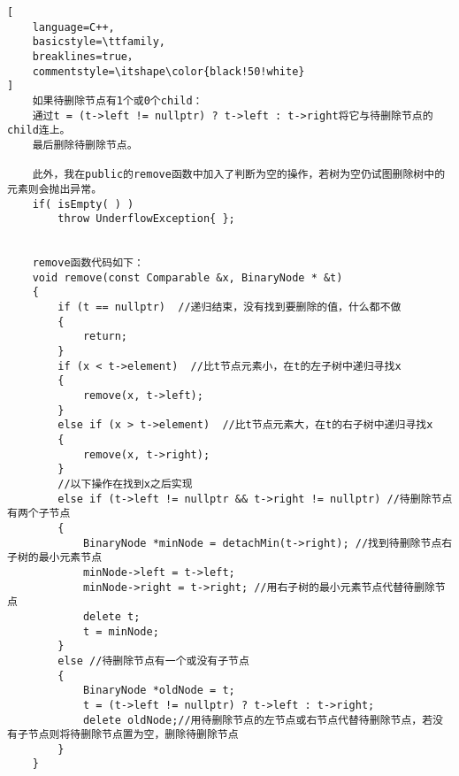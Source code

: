 \documentclass[UTF8]{ctexart}
\begin{document}
\begin{lstlisting}[
    language=C++,
    basicstyle=\ttfamily,
    breaklines=true，
    commentstyle=\itshape\color{black!50!white}
]
    如果待删除节点有1个或0个child：
    通过t = (t->left != nullptr) ? t->left : t->right将它与待删除节点的child连上。
    最后删除待删除节点。

    此外，我在public的remove函数中加入了判断为空的操作，若树为空仍试图删除树中的元素则会抛出异常。
    if( isEmpty( ) )
        throw UnderflowException{ };
      
    
    remove函数代码如下：
    void remove(const Comparable &x, BinaryNode * &t) 
    {
        if (t == nullptr)  //递归结束，没有找到要删除的值，什么都不做
        {
            return;  
        }
        if (x < t->element)  //比t节点元素小，在t的左子树中递归寻找x
        {
            remove(x, t->left);
        } 
        else if (x > t->element)  //比t节点元素大，在t的右子树中递归寻找x
        {
            remove(x, t->right);
        } 
        //以下操作在找到x之后实现
        else if (t->left != nullptr && t->right != nullptr) //待删除节点有两个子节点
        {  
            BinaryNode *minNode = detachMin(t->right); //找到待删除节点右子树的最小元素节点
            minNode->left = t->left;  
            minNode->right = t->right; //用右子树的最小元素节点代替待删除节点
            delete t; 
            t = minNode;
        } 
        else //待删除节点有一个或没有子节点
        {
            BinaryNode *oldNode = t;
            t = (t->left != nullptr) ? t->left : t->right; 
            delete oldNode;//用待删除节点的左节点或右节点代替待删除节点，若没有子节点则将待删除节点置为空，删除待删除节点
        }
    }
\end{lstlisting}
\end{document}
